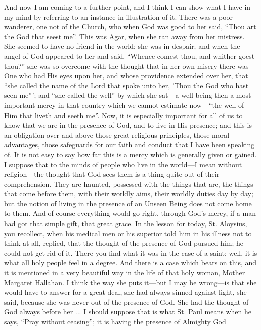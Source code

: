 And now I am coming to a further point, and I think I can show what
I have in my mind by referring to an instance in illustration of it.
There was a poor wanderer, one not of the Church, who when God was
good to her said, ``Thou art the God that seest me''. This was
Agar, when she ran away from her mistress. She seemed to have no
friend in the world; she was in despair; and when the angel of God
appeared to her and said, ``Whence comest thou, and whither goest
thou?'' she was so overcome with the thought that in her own
misery there was One who had His eyes upon her, and whose providence
extended over her, that ``she called the name of the Lord that
spoke unto her, 'Thou the God who hast seen me'''; and ``she
called the well'' by which she sat—a well being then a most
important mercy in that country which we cannot estimate now—``the
well of Him that liveth and seeth me''. Now, it is especially
important for all of us to know that we are in the presence of God,
and to live in His presence; and this is an obligation over and above
those great religious principles, those moral advantages, those
safeguards for our faith and conduct that I have been speaking of. It
is not easy to say how far this is a mercy which is generally given or
gained. I suppose that to the minds of people who live in the world—I
mean without religion—the thought that God sees them is a thing
quite out of their comprehension. They are haunted, possessed with the
things that are, the things that come before them, with their worldly
aims, their worldly duties day by day; but the notion of living in the
presence of an Unseen Being does not come home to them. And of course
everything would go right, through God's mercy, if a man had got that
simple gift, that great grace. In the lesson for today, St. Aloysius,
you recollect, when his medical men or his superior told him in his
illness not to think at all, replied, that the thought of the presence
of God pursued him; he could not get rid of it. There you find what it
was in the case of a saint; well, it is what all holy people
feel in a degree. And there is a case which bears on this, and it is
mentioned in a very beautiful way in the life of that holy woman,
Mother Margaret Hallahan. I think the way she puts it—but I may be
wrong—is that she would have to answer for a great deal, she had
always sinned against light, she said, because she was never out of
the presence of God. She had the thought of God always before her ...
I should suppose that is what St. Paul means when he says, ``Pray
without ceasing''; it is having the presence of Almighty God
